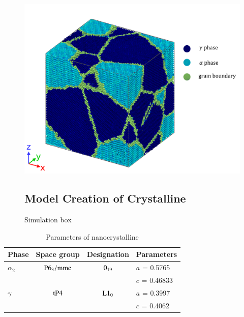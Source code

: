 \documentclass[final,5p,times,twocolumn]{elsarticle}
\begin{document}
\begin{figure}
	\centering
	\includegraphics[width=0.7\linewidth]{img/pf_model_labeled}
	\caption{Simulation box}
	\label{fig:simulation_box}
\subsection{Model Creation of Crystalline}


\end{figure}

\begin{table}[h]
	\centering
	\caption{Parameters of  nanocrystalline}

	\begin{tabular}{l c c l}
			\hline
			Phase			& Space group		& Designation		& Parameters \\
			\hline
			$\alpha_2$		& $\rm P6_3/mmc$ 	& $\rm 0_{19}$ 		& $a$ = 0.5765 \\
							&					&					& $c$ = 0.46833 \\
			$\gamma$		& $\rm tP4$ 		& $\rm L1_0$		& $a$ = 0.3997 \\
			 				&					&					& $c$ = 0.4062 \\			
			\hline
	\end{tabular}
	\label{tab:lattice_parameter}
	\end{table}
 
\end{document}
